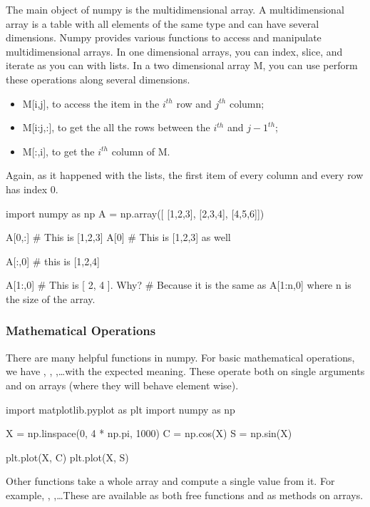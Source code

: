 The main object of numpy is the multidimensional array. A multidimensional array is a table with all elements of the same type and can have several dimensions. Numpy provides various functions to access and manipulate multidimensional arrays. In one dimensional arrays, you can index, slice, and iterate as you can with lists. In a two dimensional array M, you can use perform these operations along several dimensions.

\begin{itemize}
 \item M[i,j], to access the item in the $i^{th}$ row and $j^{th}$ column; 
 \item M[i:j,:], to get the all the rows between the $i^{th}$ and $j-1^{th}$;
 \item M[:,i], to get the $i^{th}$ column of M.
\end{itemize}

\noindent Again, as it happened with the lists, the first item of every column and every row has index 0.

\begin{python}
import numpy as np
A = np.array([
    [1,2,3],
    [2,3,4],
    [4,5,6]])

A[0,:] # This is [1,2,3]
A[0] # This is [1,2,3] as well

A[:,0] # this is [1,2,4]

A[1:,0] # This is [ 2, 4 ]. Why?
        # Because it is the same as A[1:n,0] where n is the size of the array.
\end{python}

\subsubsection{Mathematical Operations}

There are many helpful functions in numpy. For basic mathematical operations, we have , , ,\ldots with the expected meaning. These operate both on single arguments and on arrays (where they will behave element wise).

\begin{python}
import matplotlib.pyplot as plt
import numpy as np

X = np.linspace(0, 4 * np.pi, 1000)
C = np.cos(X)
S = np.sin(X)

plt.plot(X, C)
plt.plot(X, S)
\end{python}

Other functions take a whole array and compute a single value from it. For example, , ,\ldots These are available as both free functions and as methods on arrays.

